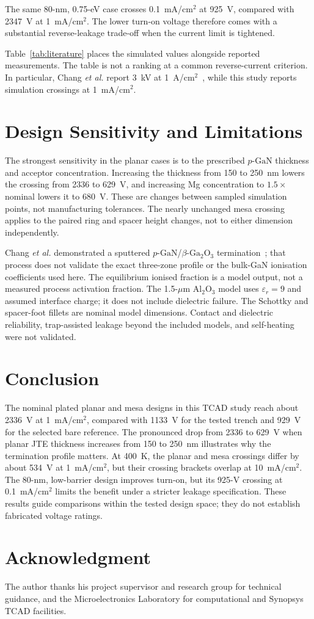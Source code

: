 \documentclass[journal,10pt]{IEEEtran}
\newcommand{\GaO}{\ensuremath{\beta\text{-}\mathrm{Ga}_2\mathrm{O}_3}}
\newcommand{\pGaN}{\ensuremath{p\text{-}\mathrm{GaN}}}
\begin{document}
The same 80-nm, 0.75-eV case crosses 0.1~mA/cm$^2$ at 925~V, compared with 2347~V at 1~mA/cm$^2$. The lower turn-on voltage therefore comes with a substantial reverse-leakage trade-off when the current limit is tightened.

Table~\ref{tab:literature} places the simulated values alongside reported measurements. The table is not a ranking at a common reverse-current criterion. In particular, Chang \emph{et al.} report 3~kV at 1~A/cm$^2$~\cite{Chang2025_APL}, while this study reports simulation crossings at 1~mA/cm$^2$.

\section{Design Sensitivity and Limitations}
The strongest sensitivity in the planar cases is to the prescribed \pGaN{} thickness and acceptor concentration. Increasing the thickness from 150 to 250~nm lowers the crossing from 2336 to 629~V, and increasing Mg concentration to $1.5\times$ nominal lowers it to 680~V. These are changes between sampled simulation points, not manufacturing tolerances. The nearly unchanged mesa crossing applies to the paired ring and spacer height changes, not to either dimension independently.

Chang \emph{et al.} demonstrated a sputtered \pGaN/\GaO{} termination~\cite{Chang2025_APL}; that process does not validate the exact three-zone profile or the bulk-GaN ionisation coefficients used here. The equilibrium ionised fraction is a model output, not a measured process activation fraction. The 1.5-$\mu$m Al$_2$O$_3$ model uses $\varepsilon_r=9$ and assumed interface charge; it does not include dielectric failure. The Schottky and spacer-foot fillets are nominal model dimensions. Contact and dielectric reliability, trap-assisted leakage beyond the included models, and self-heating were not validated.

\section{Conclusion}
The nominal plated planar and mesa designs in this TCAD study reach about 2336~V at 1~mA/cm$^2$, compared with 1133~V for the tested trench and 929~V for the selected bare reference. The pronounced drop from 2336 to 629~V when planar JTE thickness increases from 150 to 250~nm illustrates why the termination profile matters. At 400~K, the planar and mesa crossings differ by about 534~V at 1~mA/cm$^2$, but their crossing brackets overlap at 10~mA/cm$^2$. The 80-nm, low-barrier design improves turn-on, but its 925-V crossing at 0.1~mA/cm$^2$ limits the benefit under a stricter leakage specification. These results guide comparisons within the tested design space; they do not establish fabricated voltage ratings.

\section*{Acknowledgment}
The author thanks his project supervisor and research group for technical guidance, and the Microelectronics Laboratory for computational and Synopsys TCAD facilities.



\end{document}
